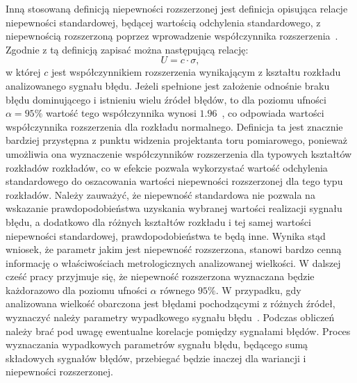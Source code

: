 Inną stosowaną definicją niepewności rozszerzonej jest definicja opisująca relacje niepewności standardowej, będącej wartością odchylenia standardowego, z niepewnością rozszerzoną poprzez wprowadzenie współczynnika rozszerzenia~\cite{jcgm_guide}. Zgodnie z tą definicją zapisać można następującą relację:
\begin{equation}
U = c \cdot \sigma \label{eq:unc_sum},
\end{equation}
w której $c$ jest współczynnikiem rozszerzenia wynikającym z kształtu rozkładu analizowanego sygnału błędu. Jeżeli spełnione jest założenie odnośnie braku błędu dominującego i istnieniu wielu źródeł błędów, to dla poziomu ufności $\alpha = 95\%$ wartość tego współczynnika wynosi $1.96$~\cite{jcgm_guide}, co odpowiada wartości współczynnika rozszerzenia dla rozkładu normalnego. Definicja ta jest znacznie bardziej przystępna z punktu widzenia projektanta toru pomiarowego, ponieważ umożliwia ona wyznaczenie współczynników rozszerzenia dla typowych kształtów rozkładów rozkładów, co w efekcie pozwala wykorzystać wartość odchylenia standardowego do oszacowania wartości niepewności rozszerzonej dla tego typu rozkładów. Należy zauważyć, że niepewność standardowa nie pozwala na wskazanie prawdopodobieństwa uzyskania wybranej wartości realizacji sygnału błędu, a dodatkowo dla różnych kształtów rozkładu i tej samej wartości niepewności standardowej, prawdopodobieństwa te będą inne. Wynika stąd wniosek, że parametr jakim jest niepewność rozszerzona, stanowi bardzo cenną informację o właściwościach metrologicznych analizowanej wielkości. W dalszej cześć pracy przyjmuje się, że niepewność rozszerzona wyznaczana będzie każdorazowo dla poziomu ufności $\alpha$ równego $95\%$. W przypadku, gdy analizowana wielkość obarczona jest błędami pochodzącymi z różnych źródeł, wyznaczyć należy parametry wypadkowego sygnału błędu~\cite{wymyslo_range}. Podczas obliczeń należy brać pod uwagę ewentualne korelacje pomiędzy sygnałami błędów. Proces wyznaczania wypadkowych parametrów sygnału błędu, będącego sumą składowych sygnałów błędów, przebiegać będzie inaczej dla wariancji i niepewności rozszerzonej.

